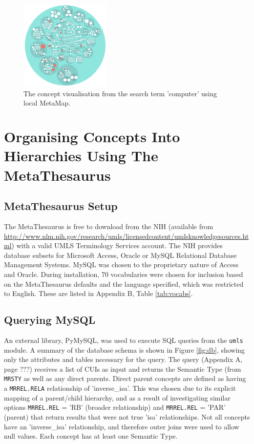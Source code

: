 \documentclass[Report.tex]{subfiles}
\begin{document}
\begin{figure}[h!]
\begin{center}
\includegraphics[width=0.4\textwidth]{../lib/images/mm-screen.png}
\caption{The concept visualisation from the search term 'computer' using local MetaMap.}
\label{fig:mm-screen}
\end{center}
\end{figure}\newpage

\section{Organising Concepts Into Hierarchies Using The MetaThesaurus}
\subsection{MetaThesaurus Setup}
The MetaThesaurus is free to download from the NIH (available from \url{http://www.nlm.nih.gov/research/umls/licensedcontent/umlsknowledgesources.html}) with a valid UMLS Terminology Services account. The NIH provides database subsets for Microsoft Access, Oracle or MySQL Relational Database Management Systems. MySQL was chosen to the proprietary nature of Access and Oracle. During installation, 70 vocabularies were chosen for inclusion based on the MetaThesaurus defaults and the language specified, which was restricted to English. These are listed in Appendix B, Table \ref{tab:vocabs}. 

\subsection{Querying MySQL}
An external library, PyMySQL, was used to execute SQL queries from the \texttt{umls} module. A summary of the database schema is shown in Figure \ref{fig:db}, showing only the attributes and tables necessary for the query. The query (Appendix A, page ???) receives a list of CUIs as input and returns the Semantic Type (from \texttt{MRSTY} as well as any direct parents. Direct parent concepts are defined as having a \texttt{MRREL.RELA} relationship of 'inverse\_isa'. This was chosen due to its explicit mapping of a parent/child hierarchy, and as a result of investigating similar options \texttt{MRREL.REL} = 'RB' (broader relationship) and \texttt{MRREL.REL} = 'PAR' (parent) that return results that were not true 'isa' relationships. Not all concepts have an 'inverse\_isa' relationship, and therefore outer joins were used to allow null values. Each concept has at least one Semantic Type.
\end{document}

